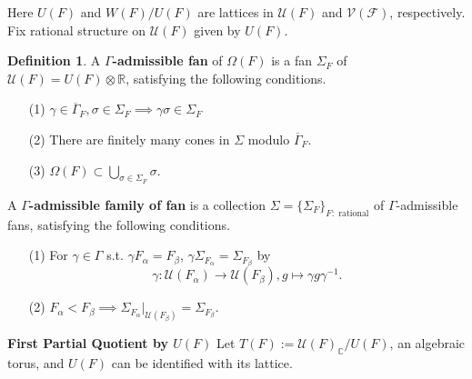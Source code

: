 \documentclass[11pt,english]{smfart}
\theoremstyle{definition}
\newtheorem{definition}{Definition}
\theoremstyle{remark}
\newcommand{\R}{\mathbb{R}}
\renewcommand{\C}{\mathbb{C}}
\renewcommand{\bar}{\overline}
\begin{document}
Here $U(F)$ and $W(F)/U(F)$ are lattices in $\mathcal{U}(F)$ and $\mathcal{V(F)}$, respectively.
Fix rational structure on $\mathcal{U}(F)$ given by $U(F)$.

\begin{definition}
    A \textbf{$\Gamma$-admissible fan} of $\Omega(F)$ is a fan $\Sigma_F$ of $\mathcal{U}(F) = U(F)\otimes\R$, satisfying the following conditions.
\begin{enumerate}
    \item [(1)] $\gamma\in\bar{\Gamma}_F, \sigma\in\Sigma_F\implies \gamma\sigma\in\Sigma_F$
    \item [(2)] There are finitely many cones in $\Sigma$ modulo $\bar{\Gamma}_F$.
    \item [(3)] $\Omega(F)\subset \bigcup_{\sigma\in\Sigma_F}\sigma$.
\end{enumerate}

A \textbf{$\Gamma$-admissible family of fan} is a collection $\Sigma = \{\Sigma_F\}_{F:\textrm{ rational}}$ of $\Gamma$-admissible fans, satisfying the following conditions.
\begin{enumerate}
    \item [(1)] For $\gamma\in\Gamma$ s.t. $\gamma F_\alpha = F_\beta$, $\gamma\Sigma_{F_\alpha} = \Sigma_{F_\beta}$ by \[\gamma:\mathcal{U}(F_\alpha)\to\mathcal{U}(F_\beta), g\mapsto\gamma g\gamma^{-1}.\]
    \item [(2)] $F_\alpha < F_\beta\implies \Sigma_{F_\alpha}|_{\mathcal{U}(F_\beta)} = \Sigma_{F_\beta}$.
\end{enumerate}
\end{definition}

\noindent\textbf{First Partial Quotient by $U(F)$}
Let $T(F) := \mathcal{U}(F)_\C /U(F)$, an algebraic torus, and $U(F)$ can be identified with its lattice.
\end{document}
